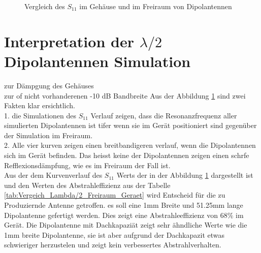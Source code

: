 \begin{figure}[!ht]
	\centering
	\begingroup
	
	\endgroup
	\caption{Vergleich des $S_{11}$ im Gehäuse und im Freiraum von Dipolantennen }	\label{S11_Vergleich_Simulation_Dipolantenn_freiraum_Geraet}
\end{figure}


\newpage
\section{Interpretation der $\lambda/2$ Dipolantennen Simulation}

zur Dämpgung des Gehäuses\\
zur of nicht vorhanderenen -10 dB Bandbreite
Aus der Abbildung \ref{S11_Vergleich_Simulation_Dipolantenn_freiraum_Geraet} sind zwei Fakten klar ersichtlich. \\
1. die Simulationen des $S_{11}$ Verlauf zeigen, dass die Resonanzfrequenz aller simulierten Dipolantennen ist tifer wenn sie im Gerät positioniert sind gegenüber der Simulation im Freiraum.\\
2. Alle vier kurven zeigen einen breitbandigeren verlauf, wenn die Dipolantennen sich im Gerät befinden. Das heisst keine der Dipolantennen zeigen einen schrfe Refflexionsdämpfung, wie es im Freiraum der Fall ist. \\
Aus der dem Kurvenverlauf des $S_{11}$ Werts der in der Abbildung \ref{S11_Vergleich_Simulation_Dipolantenn_freiraum_Geraet} dargestellt ist und den Werten des Abstrahleffizienz aus der Tabelle \ref{tab:Vergeich_Lambda/2_Freiraum_Geraet} wird Entscheid für die zu Produziernde Antenne getroffen. es soll eine 1mm Breite und 51.25mm lange Dipolantenne gefertigt werden. Dies zeigt eine Abstrahleeffizienz von 68$\%$ im Gerät. Die Dipolantenne mit Dachkapaziät zeigt sehr ähndliche Werte wie die 1mm breite Dipolantenne, sie ist aber aufgrund der Dachkapazit etwas schwieriger herzustelen und zeigt kein verbessertes Abstrahlverhalten.
